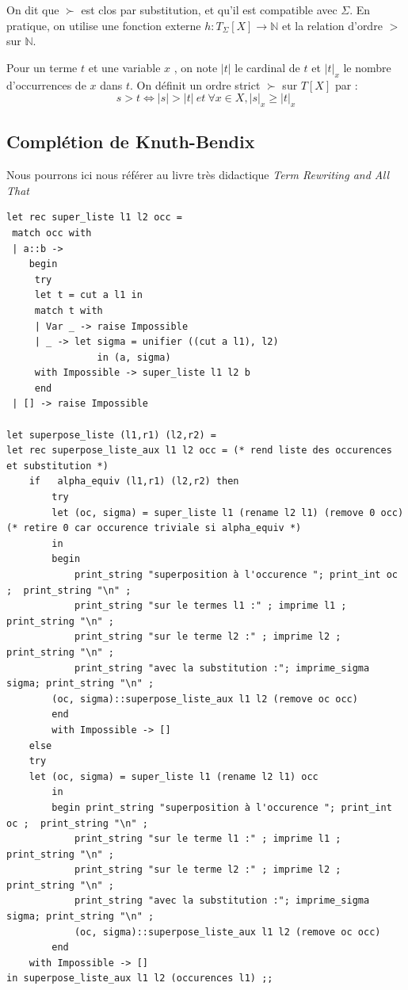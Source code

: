 On dit que $\succ$ est clos par substitution, et qu'il est compatible avec $\Sigma$.
\vspace{0.2cm}
En pratique, on utilise une fonction externe $h : T_\Sigma [X] \rightarrow \mathbb{N} $ et la relation d'ordre $>$ sur 
$\mathbb{N}$.

Pour un terme $t$ et une variable $x$ , on note $|t|$ le cardinal de $t$ et $|t|_x$ le nombre
d'occurrences de $x$ dans $t$. On définit un ordre strict $\succ$ sur $T[X]$ par :
$$ s > t \Leftrightarrow  |s| > |t|\ et\  \forall x \in X, |s|_x \geq  |t|_x $$

\subsection{Complétion de Knuth-Bendix}
Nous pourrons ici nous référer au livre très didactique \textit{Term Rewriting and All That}\cite{rewriting}
\begin{verbatim}
let rec super_liste l1 l2 occ =
 match occ with
 | a::b -> 
	begin
	 try 
	 let t = cut a l1 in
	 match t with 
	 | Var _ -> raise Impossible
	 | _ -> let sigma = unifier ((cut a l1), l2)
 				in (a, sigma)
	 with Impossible -> super_liste l1 l2 b 
	 end
 | [] -> raise Impossible
  
let superpose_liste (l1,r1) (l2,r2) =
let rec superpose_liste_aux l1 l2 occ = (* rend liste des occurences et substitution *)
	if   alpha_equiv (l1,r1) (l2,r2) then 
		try
		let (oc, sigma) = super_liste l1 (rename l2 l1) (remove 0 occ) (* retire 0 car occurence triviale si alpha_equiv *)
		in 
		begin
			print_string "superposition à l'occurence "; print_int oc ;  print_string "\n" ;
			print_string "sur le termes l1 :" ; imprime l1 ; print_string "\n" ;
			print_string "sur le terme l2 :" ; imprime l2 ; print_string "\n" ;
			print_string "avec la substitution :"; imprime_sigma sigma; print_string "\n" ;
		(oc, sigma)::superpose_liste_aux l1 l2 (remove oc occ)
		end
		with Impossible -> []
	else 
	try
	let (oc, sigma) = super_liste l1 (rename l2 l1) occ
		in 
		begin print_string "superposition à l'occurence "; print_int oc ;  print_string "\n" ;
			print_string "sur le terme l1 :" ; imprime l1 ; print_string "\n" ;
			print_string "sur le terme l2 :" ; imprime l2 ; print_string "\n" ;
			print_string "avec la substitution :"; imprime_sigma sigma; print_string "\n" ;
			(oc, sigma)::superpose_liste_aux l1 l2 (remove oc occ)
		end
	with Impossible -> []
in superpose_liste_aux l1 l2 (occurences l1) ;;
\end{verbatim}